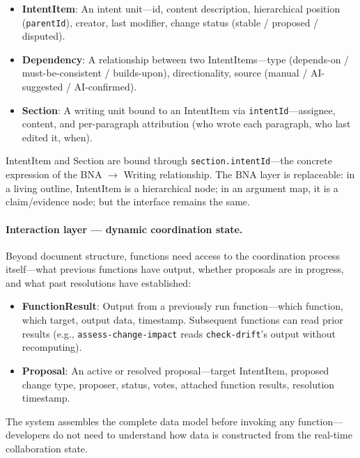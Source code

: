 \begin{itemize}[leftmargin=1.5em, itemsep=1pt]
\item \textbf{IntentItem}: An intent unit---id, content description, hierarchical position (\texttt{parentId}), creator, last modifier, change status (stable / proposed / disputed).
\item \textbf{Dependency}: A relationship between two IntentItems---type (depends-on / must-be-consistent / builds-upon), directionality, source (manual / AI-suggested / AI-confirmed).
\item \textbf{Section}: A writing unit bound to an IntentItem via \texttt{intentId}---assignee, content, and per-paragraph attribution (who wrote each paragraph, who last edited it, when).
\end{itemize}

\noindent IntentItem and Section are bound through \texttt{section.intentId}---the concrete expression of the BNA $\rightarrow$ Writing relationship. The BNA layer is replaceable: in a living outline, IntentItem is a hierarchical node; in an argument map, it is a claim/evidence node; but the interface remains the same.

\paragraph{Interaction layer --- dynamic coordination state.} Beyond document structure, functions need access to the coordination process itself---what previous functions have output, whether proposals are in progress, and what past resolutions have established:

\begin{itemize}[leftmargin=1.5em, itemsep=1pt]
\item \textbf{FunctionResult}: Output from a previously run function---which function, which target, output data, timestamp. Subsequent functions can read prior results (e.g., \texttt{assess-change-impact} reads \texttt{check-drift}'s output without recomputing).
\item \textbf{Proposal}: An active or resolved proposal---target IntentItem, proposed change type, proposer, status, votes, attached function results, resolution timestamp.
\end{itemize}

\noindent The system assembles the complete data model before invoking any function---developers do not need to understand how data is constructed from the real-time collaboration state.


